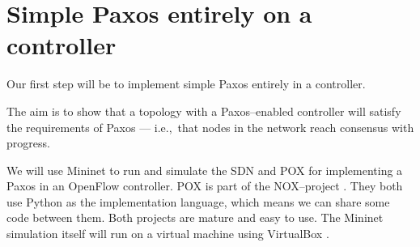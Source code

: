 \chapter{Simple Paxos entirely on a controller}

Our first step will be to implement simple Paxos \cite{Lam01} entirely in a
controller.

The aim is to show that a topology with a Paxos--enabled controller will
satisfy the requirements of Paxos --- i.e.,~that nodes in the network reach
consensus with progress.

We will use Mininet \cite{Lantz:2010:NLR:1868447.1868466} to run and
simulate the \ac{SDN} and POX \cite{POX.1} for implementing a Paxos in an
OpenFlow controller.  POX is part of the NOX--project
\cite{Gude:2008:NTO:1384609.1384625}.  They both use Python
\cite{vanRossum:2009:PRM:1610526} as the implementation language, which
means we can share some code between them.  Both projects are mature and
easy to use.  The Mininet simulation itself will run on a virtual machine
using VirtualBox \cite{Watson:2008:VBB:1344209.1344210}.
